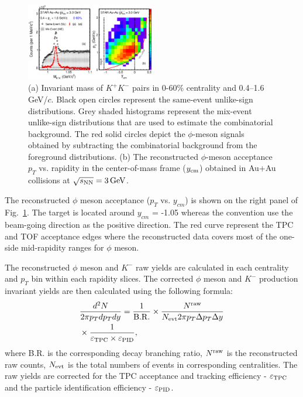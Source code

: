 \documentclass[%
 reprint,	
showpacs,
 amsmath,amssymb,
 aps,
 prc,
]{revtex4-1}
\begin{document}
\begin{figure}
\centering
\includegraphics[width=0.50\textwidth]{fig/fig1_signal.eps}
  \caption{(a) Invariant mass of $K^+K^-$ pairs in 0-60\% centrality and 0.4--1.6\,GeV/$c$. Black open circles represent the same-event unlike-sign distributions. Grey shaded histograms represent the mix-event unlike-sign distributions that are used to estimate the combinatorial background. The red solid circles depict the $\phi$-meson signals obtained by subtracting the combinatorial background from the foreground distributions. (b) The reconstructed $\phi$-meson acceptance $p_T$ vs. rapidity in the center-of-mass frame ($y_{\rm cm}$) obtained in Au+Au collisions at ${\sqrt{s_{\rm NN}} = \rm{3\,GeV}}$.}
\label{fig:phiSignal} 
\end{figure}


The reconstructed $\phi$ meson acceptance ($p_T$ vs. $y_{cm}$) is shown on the right panel of Fig.~\ref{fig:phiSignal}. The target is located around $y_{cm}$ = -1.05 whereas the convention use the beam-going direction as the positive direction. The red curve represent the TPC and TOF acceptance edges where the reconstructed data covers most of the one-side mid-rapidity ranges for $\phi$ meson.


The reconstructed $\phi$ meson and $K^-$ raw yields are calculated in each centrality and $p_{T}$ bin within each rapidity slices. The corrected $\phi$ meson and $K^-$ production invariant yields are then calculated using the following formula:
\begin{equation}
  \begin{aligned}
& \frac{d^2N}{2\pi p_{T}dp_{T}dy} = \frac{1}{\rm B.R.} \times \frac{N^{\rm raw}}{N_{\rm evt} 2\pi p_{T}\Delta p_{T}\Delta y} \\
& \times \frac{1}{\varepsilon_{\rm TPC}\times\varepsilon_{\rm PID}},
  \end{aligned}
\label{equ:invariantyield}
\end{equation}
where B.R. is the corresponding decay branching ratio, $N^{\rm raw}$ is the reconstructed raw counts, $N_{\rm evt}$ is the total numbers of events in corresponding centralities. The raw yields are corrected for the TPC acceptance and tracking efficiency - $\varepsilon_{\rm TPC}$ and the particle identification efficiency - $\varepsilon_{\rm PID}$.
\end{document}
